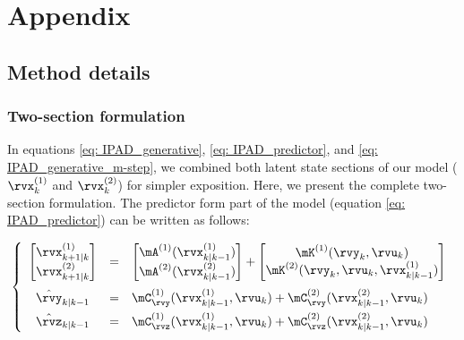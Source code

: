 \documentclass{article} %
\begin{document}




\newpage
\appendix


\section{Appendix}

\subsection{Method details}\label{app: methodDetails}

\subsubsection{Two-section formulation}\label{app: two-section-formulation}
In equations \ref{eq: IPAD_generative}, \ref{eq: IPAD_predictor}, and \ref{eq: IPAD_generative_m-step}, we combined both latent state sections of our model (\(\rvx_{k}^{(1)}\) and \(\rvx_{k}^{(2)}\)) for simpler exposition. Here, we present the complete two-section formulation. The predictor form part of the model (equation \ref{eq: IPAD_predictor}) can be written as follows:

\begin{equation}\label{eq: IPAD_base}
    \left\{%
    \begin{array}{ccl}
    \begin{bmatrix}
    \rvx_{k+1|k}^{(1)}\\
    \rvx_{k+1|k}^{(2)}
    \end{bmatrix}
    &=&
    \begin{bmatrix}
    \mA^{(1)}(\rvx_{k|k-1}^{(1)})\\
    \mA^{(2)}(\rvx_{k|k-1}^{(2)})
    \end{bmatrix}
    + 
    \begin{bmatrix}
    \mK^{(1)}(\rvy_{k}, \rvu_{k})\\
    \mK^{(2)}(\rvy_{k}, \rvu_{k}, \rvx_{k|k-1}^{(1)})
    \end{bmatrix}
    \\[15pt] 
    \hat{\rvy}_{k|k-1} &=& \mC_{\rvy}^{(1)}(\rvx_{k|k-1}^{(1)}, \rvu_{k}) + \mC_{\rvy}^{(2)}(\rvx_{k|k-1}^{(2)}, \rvu_{k})\\[5pt] %
    \hat{\rvz}_{k|k-1} &=& \mC_{\rvz}^{(1)}(\rvx_{k|k-1}^{(1)}, \rvu_{k}) + \mC_{\rvz}^{(2)}(\rvx_{k|k-1}^{(2)}, \rvu_{k})
    \end{array}
    \right.
\end{equation}
\end{document}
